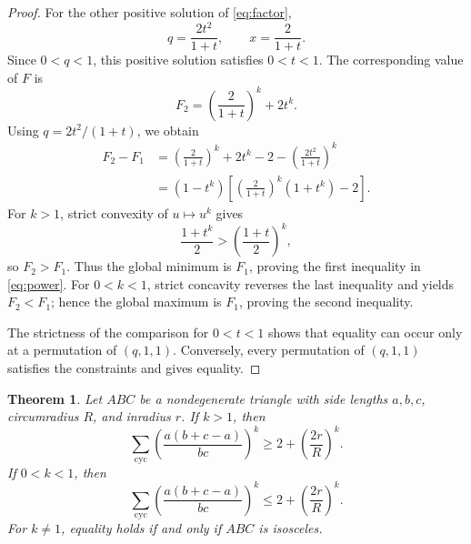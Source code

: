 \documentclass[11pt]{amsart}
\newtheorem{theorem}{Theorem}[section]
\theoremstyle{remark}
\newcommand{\cyc}{\sum_{\mathrm{cyc}}}
\begin{document}
\begin{proof}
For the other positive solution of \eqref{eq:factor},
\[
 q=\frac{2t^2}{1+t},\qquad x=\frac{2}{1+t}.
\]
Since $0<q<1$, this positive solution satisfies $0<t<1$. The corresponding value of $F$ is
\[
 F_2=\left(\frac{2}{1+t}\right)^k+2t^k.
\]
Using $q=2t^2/(1+t)$, we obtain
\begin{align*}
 F_2-F_1
 &=\left(\frac{2}{1+t}\right)^k+2t^k-2
   -\left(\frac{2t^2}{1+t}\right)^k\\
 &=(1-t^k)\left[\left(\frac{2}{1+t}\right)^k(1+t^k)-2\right].
\end{align*}
For $k>1$, strict convexity of $u\mapsto u^k$ gives
\[
 \frac{1+t^k}{2}>\left(\frac{1+t}{2}\right)^k,
\]
so $F_2>F_1$. Thus the global minimum is $F_1$, proving the first inequality in \eqref{eq:power}. For $0<k<1$, strict concavity reverses the last inequality and yields $F_2<F_1$; hence the global maximum is $F_1$, proving the second inequality.

The strictness of the comparison for $0<t<1$ shows that equality can occur only at a permutation of $(q,1,1)$. Conversely, every permutation of \((q,1,1)\) satisfies the constraints and gives equality.
\end{proof}

\begin{theorem}\label{thm:main}
Let $ABC$ be a nondegenerate triangle with side lengths $a,b,c$, circumradius $R$, and inradius $r$. If $k>1$, then
\begin{equation}\label{eq:mainplus}
 \cyc \left(\frac{a(b+c-a)}{bc}\right)^k
 \ge 2+\left(\frac{2r}{R}\right)^k.
\end{equation}
If $0<k<1$, then
\begin{equation}\label{eq:mainminus}
 \cyc \left(\frac{a(b+c-a)}{bc}\right)^k
 \le 2+\left(\frac{2r}{R}\right)^k.
\end{equation}
For $k\ne1$, equality holds if and only if $ABC$ is isosceles.
\end{theorem}
\end{document}
